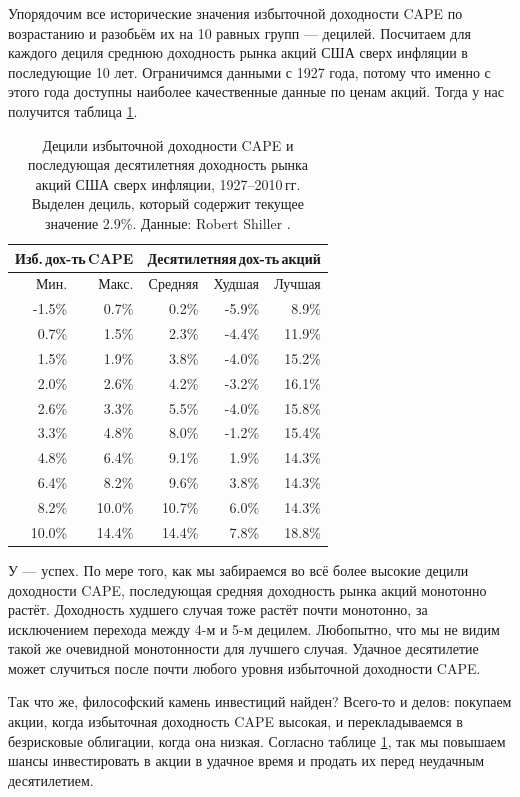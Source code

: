 Упорядочим все исторические значения избыточной доходности CAPE по возрастанию 
и разобьём их на 10 равных групп --- децилей. Посчитаем для каждого дециля 
среднюю доходность рынка акций США сверх инфляции в последующие 10 лет. 
Ограничимся данными с 1927 года, потому что именно с этого года доступны 
наиболее качественные данные по ценам акций. Тогда у нас получится таблица 
\ref{cape_excess_yield_and_stock_returns_table}.

\begin{table}[h]
\centering
\begin{tabular}{r|r|r|r|r}
\multicolumn{2}{c|}{Изб.\,дох-ть\,CAPE} &
\multicolumn{3}{c}{Десятилетняя\,дох-ть\,акций} \\
\hline
Мин. & Макс. & Средняя & Худшая & Лучшая \\
\hline
-1.5\% &  0.7\% &  0.2\%  & -5.9\% &  8.9\% \\
 0.7\% &  1.5\% &  2.3\%  & -4.4\% & 11.9\% \\
 1.5\% &  1.9\% &  3.8\%  & -4.0\% & 15.2\% \\
 2.0\% &  2.6\% &  4.2\%  & -3.2\% & 16.1\% \\ 
\hline
 2.6\% &  3.3\% &  5.5\%  & -4.0\% & 15.8\% \\
\hline
 3.3\% &  4.8\% &  8.0\%  & -1.2\% & 15.4\% \\
 4.8\% &  6.4\% &  9.1\%  &  1.9\% & 14.3\% \\
 6.4\% &  8.2\% &  9.6\%  &  3.8\% & 14.3\% \\
 8.2\% & 10.0\% &  10.7\% &  6.0\% & 14.3\% \\ 
10.0\% & 14.4\% &  14.4\% &  7.8\% & 18.8\%  
\end{tabular}
\caption{Децили избыточной доходности CAPE и последующая десятилетняя 
доходность рынка акций США сверх инфляции, 1927--2010\,гг. Выделен дециль, 
который содержит текущее значение 2.9\%. Данные: Robert Shiller 
\cite{shillerOnline}.}
\label{cape_excess_yield_and_stock_returns_table}
\end{table}

У --- успех. По мере того, как мы забираемся во всё более высокие децили 
доходности CAPE, последующая средняя доходность рынка акций монотонно растёт. 
Доходность худшего случая тоже растёт почти монотонно, за исключением перехода 
между 4-м и 5-м децилем. Любопытно, что мы не видим такой же очевидной 
монотонности для лучшего случая. Удачное десятилетие может случиться  
после почти любого уровня избыточной доходности CAPE.

Так что же, философский камень инвестиций найден? Всего-то и делов: покупаем 
акции, когда избыточная доходность CAPE высокая, и перекладываемся в 
безрисковые облигации, когда она низкая. Согласно таблице 
\ref{cape_excess_yield_and_stock_returns_table}, так мы повышаем шансы 
инвестировать в акции в удачное время и продать их перед неудачным 
десятилетием.

